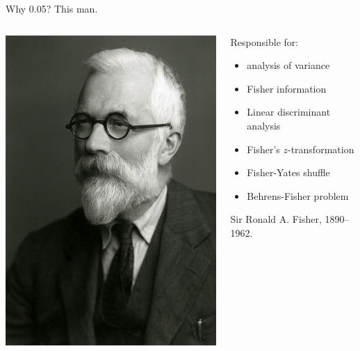 \documentclass[ignorenonframetext,]{beamer}
\begin{document}
\begin{frame}{Why 0.05? This man.}
\protect\hypertarget{why-0.05-this-man.}{}

\begin{columns}
  \begin{column}{0.3\textwidth}
      \includegraphics[width=\textwidth]{fisher}
  \end{column}
  \begin{column}{0.7\textwidth}
    Responsible for:
  
  \begin{itemize}
  \item analysis of variance
  \item Fisher information
  \item Linear discriminant analysis
  \item Fisher's $z$-transformation
  \item Fisher-Yates shuffle
  \item Behrens-Fisher problem
  \end{itemize}
  
   Sir Ronald A. Fisher, 1890--1962.

  \end{column}
\end{columns}

\end{frame}
\end{document}
